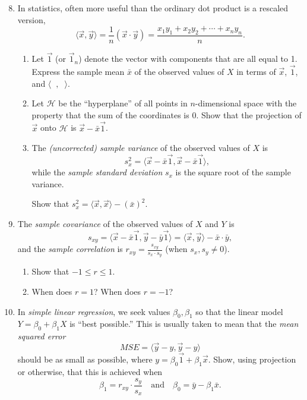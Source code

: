 \begin{enumerate}\setcounter{enumi}{7}
\item In statistics, often more useful than the ordinary dot product is a rescaled version,
\begin{equation*}
\langle\vec{x},\vec{y}\rangle = \frac{1}{n}(\vec{x}\cdot\vec{y}) = \frac{x_1y_1 + x_2y_2 + \cdots + x_ny_n}{n}.
\end{equation*}
\begin{enumerate}
\item Let $\vec{1}$ (or $\vec{1}_n$) denote the vector with components that are all equal to 1. Express the sample mean $\bar{x}$ of the observed values of $X$ in terms of $\vec{x}$, $\vec{1}$, and $\langle\phantom{x},\phantom{x}\rangle$.
\item Let $\mathcal{H}$ be the ``hyperplane'' of all points in $n$-dimensional space with the property that the sum of the coordinates is 0. Show that the projection of $\vec{x}$ onto $\mathcal{H}$ is $\vec{x} - \bar{x}\vec{1}$.
\item The \emph{(uncorrected) sample variance} of the observed values of $X$ is
\begin{equation*}
s_x^2 = \langle\vec{x} - \bar{x}\vec{1}, \vec{x} - \bar{x}\vec{1}\rangle,
\end{equation*}
while the \emph{sample standard deviation} $s_x$ is the square root of the sample variance.\par
Show that $s_x^2 = \langle\vec{x},\vec{x}\rangle - (\bar{x})^2$.
\end{enumerate}
\item The \emph{sample covariance} of the observed values of $X$ and $Y$ is
\begin{equation*}
s_{xy} = \langle\vec{x} - \bar{x}\vec{1}, \vec{y} - \bar{y}\vec{1}\rangle = \langle\vec{x},\vec{y}\rangle - \bar{x}\cdot\bar{y},
\end{equation*}
and the \emph{sample correlation} is $r_{xy} = \frac{s_{xy}}{s_x\cdot s_y}$ (when $s_x,s_y\neq 0$).
\begin{enumerate}
\item Show that $-1\leq r\leq 1$.
\item When does $r = 1$? When does $r = -1$?
\end{enumerate}
\item In \emph{simple linear regression}, we seek values $\beta_0,\beta_1$ so that the linear model $Y = \beta_0 + \beta_1X$ is ``best possible.'' This is usually taken to mean that the \emph{mean squared error}
\begin{equation*}
MSE = \langle\vec{y} - \unit{y}, \vec{y} - \unit{y}\rangle
\end{equation*}
should be as small as possible, where $\unit{y} = \beta_0\vec{1} + \beta_1\vec{x}$. Show, using projection or otherwise, that this is achieved when
\begin{equation*}
\beta_1 = r_{xy}\cdot\frac{s_y}{s_x}\quad\text{and}\quad\beta_0 = \bar{y} - \beta_1\bar{x}.
\end{equation*}
\end{enumerate}


